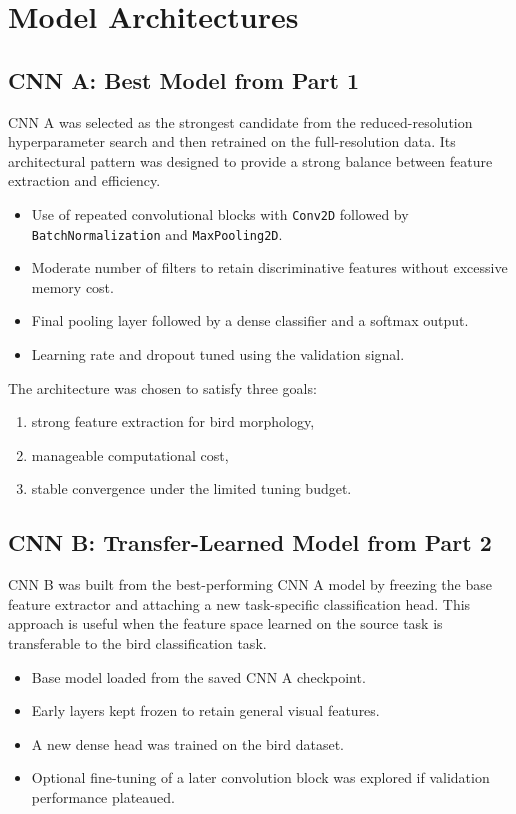 \documentclass[11pt, a4paper]{report}
\begin{document}
\chapter{Model Architectures}
\section{CNN A: Best Model from Part 1}
CNN A was selected as the strongest candidate from the reduced-resolution hyperparameter search and then retrained on the full-resolution data. Its architectural pattern was designed to provide a strong balance between feature extraction and efficiency.

\begin{itemize}[leftmargin=1.5em]
    \item Use of repeated convolutional blocks with \texttt{Conv2D} followed by \texttt{BatchNormalization} and \texttt{MaxPooling2D}.
    \item Moderate number of filters to retain discriminative features without excessive memory cost.
    \item Final pooling layer followed by a dense classifier and a softmax output.
    \item Learning rate and dropout tuned using the validation signal.
\end{itemize}

The architecture was chosen to satisfy three goals:
\begin{enumerate}[leftmargin=2em]
    \item strong feature extraction for bird morphology,
    \item manageable computational cost,
    \item stable convergence under the limited tuning budget.
\end{enumerate}

\section{CNN B: Transfer-Learned Model from Part 2}
CNN B was built from the best-performing CNN A model by freezing the base feature extractor and attaching a new task-specific classification head. This approach is useful when the feature space learned on the source task is transferable to the bird classification task.

\begin{itemize}[leftmargin=1.5em]
    \item Base model loaded from the saved CNN A checkpoint.
    \item Early layers kept frozen to retain general visual features.
    \item A new dense head was trained on the bird dataset.
    \item Optional fine-tuning of a later convolution block was explored if validation performance plateaued.
\end{itemize}
\end{document}

